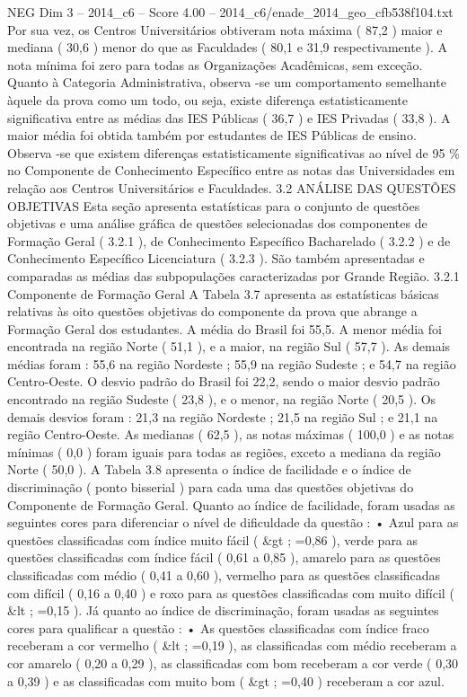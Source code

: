 \begin{textsample}{NEG Dim 3 – 2014\_c6 – Score 4.00 – 2014\_c6/enade\_2014\_geo\_cfb538f104.txt}
Por sua vez, os Centros Universitários obtiveram nota máxima ( 87,2 ) maior e mediana ( 30,6 ) menor do que as Faculdades ( 80,1 e 31,9 respectivamente ).
A nota mínima foi zero para todas as Organizações Acadêmicas, sem exceção.
Quanto à Categoria Administrativa, observa -se um comportamento semelhante àquele da prova como um todo, ou seja, existe diferença estatisticamente significativa entre as médias das IES Públicas ( 36,7 ) e IES Privadas ( 33,8 ).
A maior média foi obtida também por estudantes de IES Públicas de ensino.
Observa -se que existem diferenças estatisticamente significativas ao nível de 95 \% no Componente de Conhecimento Específico entre as notas das Universidades em relação aos Centros Universitários e Faculdades. 3.2 ANÁLISE DAS QUESTÕES OBJETIVAS Esta seção apresenta estatísticas para o conjunto de questões objetivas e uma análise gráfica de questões selecionadas dos componentes de Formação Geral ( 3.2.1 ), de Conhecimento Específico Bacharelado ( 3.2.2 ) e de Conhecimento Específico Licenciatura ( 3.2.3 ).
São também apresentadas e comparadas as médias das subpopulações caracterizadas por Grande Região. 3.2.1 Componente de Formação Geral A Tabela 3.7 apresenta as estatísticas básicas relativas às oito questões objetivas do componente da prova que abrange a Formação Geral dos estudantes.
A média do Brasil foi 55,5.
A menor média foi encontrada na região Norte ( 51,1 ), e a maior, na região Sul ( 57,7 ).
As demais médias foram : 55,6 na região Nordeste ; 55,9 na região Sudeste ; e 54,7 na região Centro-Oeste.
O desvio padrão do Brasil foi 22,2, sendo o maior desvio padrão encontrado na região Sudeste ( 23,8 ), e o menor, na região Norte ( 20,5 ).
Os demais desvios foram : 21,3 na região Nordeste ; 21,5 na região Sul ; e 21,1 na região Centro-Oeste.
As medianas ( 62,5 ), as notas máximas ( 100,0 ) e as notas mínimas ( 0,0 ) foram iguais para todas as regiões, exceto a mediana da região Norte ( 50,0 ).
A Tabela 3.8 apresenta o índice de facilidade e o índice de discriminação ( ponto bisserial ) para cada uma das questões objetivas do Componente de Formação Geral.
Quanto ao índice de facilidade, foram usadas as seguintes cores para diferenciar o nível de dificuldade da questão : • Azul para as questões classificadas com índice muito fácil ( \&gt ; =0,86 ), verde para as questões classificadas com índice fácil ( 0,61 a 0,85 ), amarelo para as questões classificadas com médio ( 0,41 a 0,60 ), vermelho para as questões classificadas com difícil ( 0,16 a 0,40 ) e roxo para as questões classificadas com muito difícil ( \&lt ; =0,15 ).
Já quanto ao índice de discriminação, foram usadas as seguintes cores para qualificar a questão : • As questões classificadas com índice fraco receberam a cor vermelho ( \&lt ; =0,19 ), as classificadas com médio receberam a cor amarelo ( 0,20 a 0,29 ), as classificadas com bom receberam a cor verde ( 0,30 a 0,39 ) e as classificadas com muito bom ( \&gt ; =0,40 ) receberam a cor azul.

\end{textsample}
